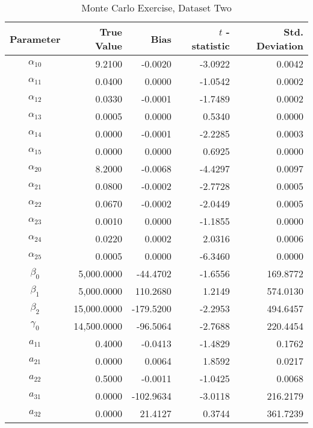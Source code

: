 \begin{table}\onehalfspacing
\begin{center}
\begin{threeparttable}
  \caption{Monte Carlo Exercise, Dataset Two}
  \label{Monte Carlo: Two}
  \begin{tabular}{crrrr}\toprule

  Parameter & True Value & Bias & $t$ - statistic & Std. Deviation \\
  \midrule
  $\alpha_{10}$ &      \phantom{20000}9.2100 &  -0.0020 & -3.0922 &     0.0042 \\
  $\alpha_{11}$ &      0.0400 &  0.0000 & -1.0542 & 0.0002 \\
  $\alpha_{12}$ &      0.0330 &  -0.0001 & -1.7489 & 0.0002 \\
  $\alpha_{13}$ &      0.0005 &  0.0000 &  0.5340 & 0.0000 \\
  $\alpha_{14}$ &      0.0000 & -0.0001 & -2.2285 & 0.0003 \\
  $\alpha_{15}$ &      0.0000 &  0.0000 &  0.6925 & 0.0000 \\
  $\alpha_{20}$ &      8.2000 & -0.0068 & -4.4297 & 0.0097 \\
  $\alpha_{21}$ &      0.0800 & -0.0002 & -2.7728 & 0.0005 \\
  $\alpha_{22}$ &      0.0670 & -0.0002 & -2.0449 & 0.0005 \\
  $\alpha_{23}$ &      0.0010 & 0.0000 & -1.1855 & 0.0000 \\
  $\alpha_{24}$ &      0.0220 & 0.0002 & 2.0316 & 0.0006 \\
  $\alpha_{25}$ &      0.0005 & 0.0000 & -6.3460 & 0.0000 \\
  $\beta_{0}$   &   5,000.0000 & -44.4702 & -1.6556 &  169.8772\\
  $\beta_{1}$   &   5,000.0000 & 110.2680 &  1.2149 & 574.0130 \\
  $\beta_{2}$   &  15,000.0000 &-179.5200 & -2.2953 & 494.6457 \\
  $\gamma_{0}$  &  14,500.0000 & -96.5064 & -2.7688 & 220.4454 \\
  $a_{11}$      &      0.4000 & -0.0413 & -1.4829 & 0.1762 \\
  $a_{21}$      &      0.0000 & 0.0064 & 1.8592 & 0.0217 \\
  $a_{22}$      &      0.5000 & -0.0011 & -1.0425 & 0.0068 \\
  $a_{31}$      &      0.0000 & -102.9634 & -3.0118 & 216.2179 \\
  $a_{32}$      &      0.0000 &  21.4127 & 0.3744 & 361.7239 \\

\end{tabular}
\end{threeparttable}
\end{center}
\end{table}
